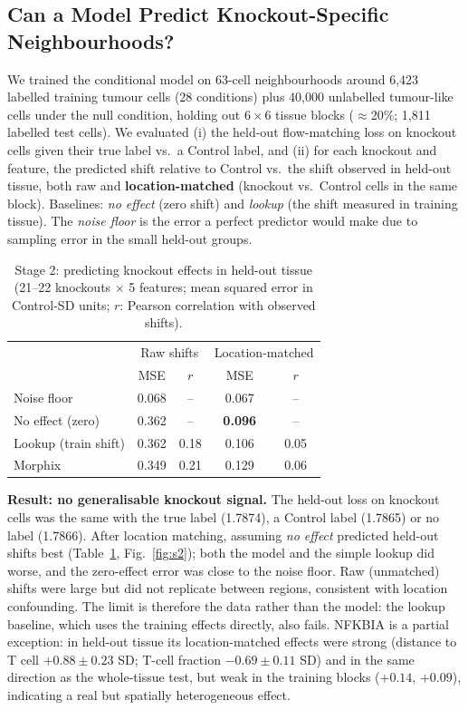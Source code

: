 \documentclass[journal]{IEEEtran}
\begin{document}
\subsection{Can a Model Predict Knockout-Specific Neighbourhoods?}
We trained the conditional model on 63-cell neighbourhoods around 6{,}423 labelled training tumour cells (28 conditions) plus 40{,}000 unlabelled tumour-like cells under the null condition, holding out $6\times6$ tissue blocks ($\approx$20\%; 1{,}811 labelled test cells). We evaluated (i) the held-out flow-matching loss on knockout cells given their true label vs.\ a Control label, and (ii) for each knockout and feature, the predicted shift relative to Control vs.\ the shift observed in held-out tissue, both raw and \textbf{location-matched} (knockout vs.\ Control cells in the same block). Baselines: \emph{no effect} (zero shift) and \emph{lookup} (the shift measured in training tissue). The \emph{noise floor} is the error a perfect predictor would make due to sampling error in the small held-out groups.

\begin{table}[!t]
\centering
\caption{Stage 2: predicting knockout effects in held-out tissue (21--22 knockouts $\times$ 5 features; mean squared error in Control-SD units; $r$: Pearson correlation with observed shifts).}
\label{tab:s2}
\footnotesize
\setlength{\tabcolsep}{4pt}
\begin{tabular}{lcc|cc}
\toprule
 & \multicolumn{2}{c|}{Raw shifts} & \multicolumn{2}{c}{Location-matched} \\
 & MSE & $r$ & MSE & $r$ \\
\midrule
Noise floor          & 0.068 & -- & 0.067 & -- \\
No effect (zero)     & 0.362 & -- & \textbf{0.096} & -- \\
Lookup (train shift) & 0.362 & 0.18 & 0.106 & 0.05 \\
Morphix              & 0.349 & 0.21 & 0.129 & 0.06 \\
\bottomrule
\end{tabular}
\end{table}

\textbf{Result: no generalisable knockout signal.} The held-out loss on knockout cells was the same with the true label (1.7874), a Control label (1.7865) or no label (1.7866). After location matching, assuming \emph{no effect} predicted held-out shifts best (Table~\ref{tab:s2}, Fig.~\ref{fig:s2}); both the model and the simple lookup did worse, and the zero-effect error was close to the noise floor. Raw (unmatched) shifts were large but did not replicate between regions, consistent with location confounding. The limit is therefore the data rather than the model: the lookup baseline, which uses the training effects directly, also fails. NFKBIA is a partial exception: in held-out tissue its location-matched effects were strong (distance to T cell $+0.88 \pm 0.23$ SD; T-cell fraction $-0.69 \pm 0.11$ SD) and in the same direction as the whole-tissue test, but weak in the training blocks ($+0.14$, $+0.09$), indicating a real but spatially heterogeneous effect.
\end{document}
